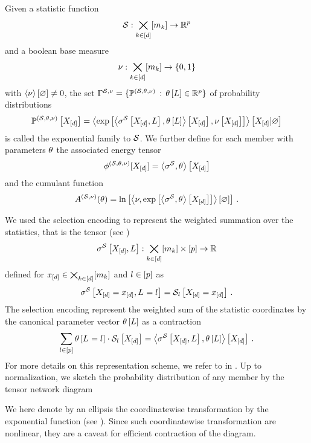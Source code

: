 \begin{definition}
    \label{def:expFamily}
    Given a statistic function
    \begin{align*}
        \mathcal{S} : \bigtimes_{k\in[d]}[m_{k}] \rightarrow \mathbb{R}^{p}
    \end{align*}
    and a boolean base measure
    \begin{align*}
        \nu : \bigtimes_{k\in[d]}[m_{k}] \rightarrow \{0,1\}
    \end{align*}
    with $\left\langle \nu\right\rangle \left[ \varnothing \right]\neq0$, the set $\Gamma^{\mathcal{S},\nu}=\{\mathbb{P}^{(\mathcal{S},\theta,\nu)} \,:\,\theta\left[L\right]\in\mathbb{R}^{p}\}$ of probability distributions
    \begin{align*}
        \mathbb{P}^{(\mathcal{S},\theta,\nu)}\left[X_{[d]}\right] = \left\langle \mathrm{exp}\left[\left\langle \sigma^{\mathcal{S}}\left[X_{[d]},L\right],\theta\left[L\right]\right\rangle \left[ X_{[d]} \right],\nu\left[X_{[d]}\right]\right]\right\rangle \left[ X_{[d]} | \varnothing \right]
    \end{align*}
    is called the exponential family to $\mathcal{S}$.
    We further define for each member with parameters $\theta$ the associated energy tensor
    \begin{align*}
        \phi^{(\mathcal{S},\theta,\nu)}[X_{[d]}] = \left\langle \sigma^{\mathcal{S}},\theta\right\rangle \left[ X_{[d]} \right]
    \end{align*}
    and the cumulant function
    \[ A^{(\mathcal{S},\nu)}(\theta) = \ln \left[ \left\langle \nu,\mathrm{exp}\left[\left\langle \sigma^{\mathcal{S}},\theta\right\rangle \left[ X_{[d]} \right] \right]\right\rangle \left[ \varnothing \right]  \right] \, .\]
\end{definition}


We used the selection encoding to represent the weighted summation over the statistics, that is the tensor (see )
\begin{align*}
    \sigma^{\mathcal{S}}\left[X_{[d]},L\right]: \bigtimes_{k\in[d]}[m_{k}] \times [p] \rightarrow \mathbb{R}
\end{align*}
defined for $x_{[d]}\in\bigtimes_{k\in[d]}[m_{k}]$ and $l\in[p]$ as
\begin{align*}
    \sigma^{\mathcal{S}}\left[X_{[d]}=x_{[d]},L_{}=l_{}\right] = \mathcal{S}_{l}\left[X_{[d]}=x_{[d]}\right] \, .
\end{align*}
The selection encoding represent the weighted sum of the statistic coordinates by the canonical parameter vector $\theta\left[L\right]$ as a contraction
\begin{align*}
    \sum_{l\in[p]}\theta\left[L_{}=l_{}\right]\cdot \mathcal{S}_{l}\left[X_{[d]}\right]
    = \left\langle \sigma^{\mathcal{S}}\left[X_{[d]},L\right],\theta\left[L\right]\right\rangle \left[ X_{[d]} \right] \, .
\end{align*}
For more details on this representation scheme, we refer to  in .
Up to normalization, we sketch the probability distribution of any member by the tensor network diagram
\begin{center}
    
\end{center}
We here denote by an ellipsis the coordinatewise transformation by the exponential function (see ).
Since such coordinatewise transformation are nonlinear, they are a caveat for efficient contraction of the diagram.

